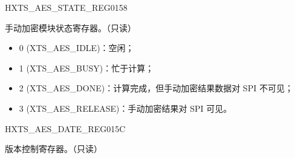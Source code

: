 \begin{register}{H}{XTS\_AES\_STATE\_REG}{\hexprefix{}0158}\label{regdesc:XTSAESSTATEREG}
%
%
\regnewline%
\begin{regdesc}\begin{reglist}
\item [XTS\_AES\_STATE] 手动加密模块状态寄存器。（只读）
    \begin{itemize}
        \item \hexprefix{}0 (XTS\_AES\_IDLE)：空闲；
        \item \hexprefix{}1 (XTS\_AES\_BUSY)：忙于计算；
        \item \hexprefix{}2 (XTS\_AES\_DONE)：计算完成，但手动加密结果数据对 SPI 不可见；
        \item \hexprefix{}3 (XTS\_AES\_RELEASE)：手动加密结果对 SPI 可见。
    \end{itemize}
\end{reglist}\end{regdesc}
\end{register}


\begin{register}{H}{XTS\_AES\_DATE\_REG}{\hexprefix{}015C}\label{regdesc:XTSAESDATEREG}
%
%
\regnewline%
\begin{regdesc}\begin{reglist}
\item [XTS\_AES\_DATE] 版本控制寄存器。（只读）
\end{reglist}\end{regdesc}
\end{register}
